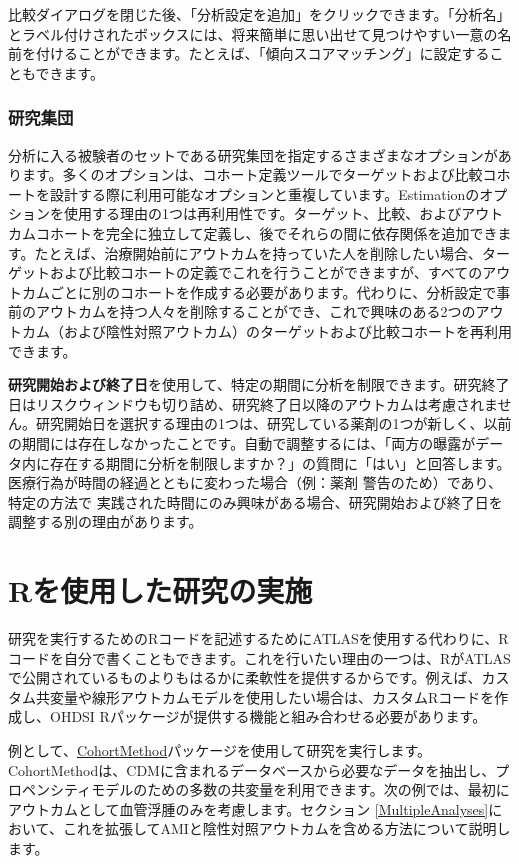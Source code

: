 \documentclass[
  11pt]{book}
\theoremstyle{definition}
\theoremstyle{definition}
\theoremstyle{definition}
\theoremstyle{definition}
\theoremstyle{remark}
\begin{document}
比較ダイアログを閉じた後、「分析設定を追加」をクリックできます。「分析名」とラベル付けされたボックスには、将来簡単に思い出せて見つけやすい一意の名前を付けることができます。たとえば、「傾向スコアマッチング」に設定することもできます。

\subsubsection*{研究集団}\label{ux7814ux7a76ux96c6ux56e3}

分析に入る被験者のセットである研究集団を指定するさまざまなオプションがあります。多くのオプションは、コホート定義ツールでターゲットおよび比較コホートを設計する際に利用可能なオプションと重複しています。Estimationのオプションを使用する理由の1つは再利用性です。ターゲット、比較、およびアウトカムコホートを完全に独立して定義し、後でそれらの間に依存関係を追加できます。たとえば、治療開始前にアウトカムを持っていた人を削除したい場合、ターゲットおよび比較コホートの定義でこれを行うことができますが、すべてのアウトカムごとに別のコホートを作成する必要があります。代わりに、分析設定で事前のアウトカムを持つ人々を削除することができ、これで興味のある2つのアウトカム（および陰性対照アウトカム）のターゲットおよび比較コホートを再利用できます。

\textbf{研究開始および終了日}を使用して、特定の期間に分析を制限できます。研究終了日はリスクウィンドウも切り詰め、研究終了日以降のアウトカムは考慮されません。研究開始日を選択する理由の1つは、研究している薬剤の1つが新しく、以前の期間には存在しなかったことです。自動で調整するには、「両方の曝露がデータ内に存在する期間に分析を制限しますか？」の質問に「はい」と回答します。医療行為が時間の経過とともに変わった場合（例：薬剤 警告のため）であり、特定の方法で 実践された時間にのみ興味がある場合、研究開始および終了日を調整する別の理由があります。

\section{Rを使用した研究の実施}\label{pleR}

研究を実行するためのRコードを記述するためにATLASを使用する代わりに、Rコードを自分で書くこともできます。これを行いたい理由の一つは、RがATLASで公開されているものよりもはるかに柔軟性を提供するからです。例えば、カスタム共変量や線形アウトカムモデルを使用したい場合は、カスタムRコードを作成し、OHDSI Rパッケージが提供する機能と組み合わせる必要があります。

例として、\href{https://ohdsi.github.io/CohortMethod/}{CohortMethod}パッケージを使用して研究を実行します。CohortMethodは、CDMに含まれるデータベースから必要なデータを抽出し、プロペンシティモデルのための多数の共変量を利用できます。次の例では、最初にアウトカムとして血管浮腫のみを考慮します。セクション \ref{MultipleAnalyses}において、これを拡張してAMIと陰性対照アウトカムを含める方法について説明します。
\end{document}
